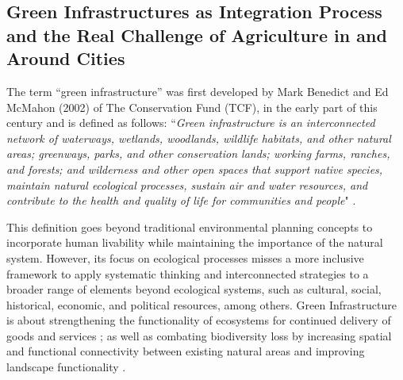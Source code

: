 \documentclass[10pt,a4paper]{article}
\begin{document}
\begin{multicols}{2}

\vspace{\baselineskip}

\subsection{Green Infrastructures as Integration Process and the Real Challenge of Agriculture in and Around Cities}
\noindent The term ``green infrastructure'' was first developed by Mark Benedict and Ed McMahon (2002) of The Conservation Fund (TCF), in the early part of this century and is defined as follows: ``\textit{Green infrastructure is an interconnected network of waterways, wetlands, woodlands, wildlife habitats, and other natural areas; greenways, parks, and other conservation lands; working farms, ranches, and forests; and wilderness and other open spaces that support native species, maintain natural ecological processes, sustain air and water resources, and contribute to the health and quality of life for communities and people}" \citep{r41}.

This definition goes beyond traditional environmental planning concepts to incorporate human livability while maintaining the importance of the natural system. However, its focus on ecological processes misses a more inclusive framework to apply systematic thinking and interconnected strategies to a broader range of elements beyond ecological systems, such as cultural, social, historical, economic, and political resources, among others. Green Infrastructure is about strengthening the functionality of ecosystems for continued delivery of goods and services \citep{r42}; as well as combating biodiversity loss by increasing spatial and functional connectivity between existing natural areas and improving landscape functionality \citep{r43, r44, r45}.


\end{multicols}
\end{document}
